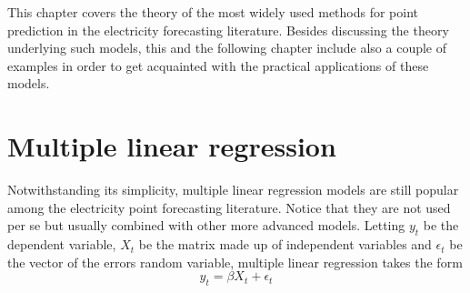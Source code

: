 This chapter covers the theory of the most widely used methods for point prediction in the electricity forecasting literature. Besides discussing the theory underlying such models, this and the following chapter include also a couple of examples in order to get acquainted with the practical applications of these models.




\section{Multiple linear regression}
Notwithstanding its simplicity, multiple linear regression models are still popular among the electricity point forecasting literature. Notice that they are not used per se but usually combined with other more advanced models.
Letting $y_t$ be the dependent variable, $X_t$ be the matrix made up of independent variables and $\epsilon_t$ be the vector of the errors random variable, multiple linear regression takes the form
\begin{equation}
    y_t=\beta X_t + \epsilon_t
\end{equation}

